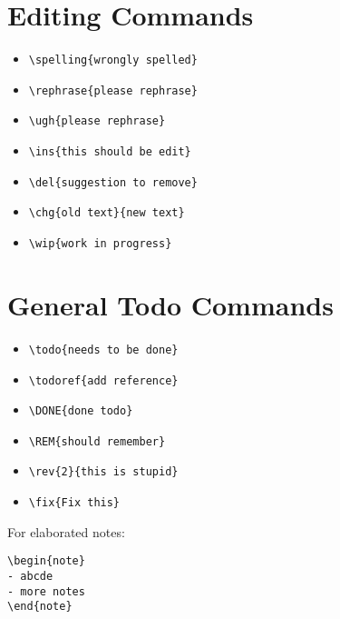 \documentclass{article}
\begin{document}
\section{Editing Commands}

\begin{itemize}
  \item \verb|\spelling{wrongly spelled}| 

  \item \verb|\rephrase{please rephrase}| 

  \item \verb|\ugh{please rephrase}| 

  \item \verb|\ins{this should be edit}| 

  \item \verb|\del{suggestion to remove}| 

  \item \verb|\chg{old text}{new text}| 
  
  \item \verb|\wip{work in progress}| 
\end{itemize}

\section{General Todo Commands}

\begin{itemize}
  \item \verb|\todo{needs to be done}|  
  \item \verb|\todoref{add reference}| 
  \item \verb|\DONE{done todo}| 
  \item \verb|\REM{should remember}| 
  \item \verb|\rev{2}{this is stupid}| 
  \item \verb|\fix{Fix this}| 
\end{itemize}

For elaborated notes:

\begin{verbatim}
\begin{note}
- abcde
- more notes
\end{note}
\end{verbatim}
\end{document}
